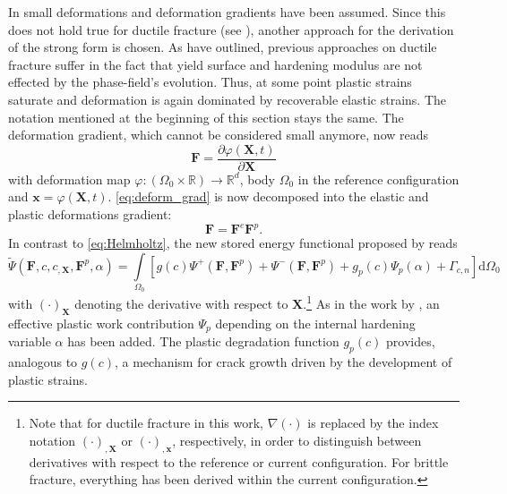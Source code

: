 In  small deformations and deformation gradients have been assumed. Since this does not hold true for ductile fracture (see ), another approach for the derivation of the strong form is chosen. As \citet{03_PF_ductile} have outlined, previous approaches on ductile fracture suffer in the fact that yield surface and hardening modulus are not effected by the phase-field's evolution. Thus, at some point plastic strains saturate and deformation is again dominated by recoverable elastic strains. The notation mentioned at the beginning of this section stays the same. The deformation gradient, which cannot be considered small anymore, now reads
\begin{equation} \label{eq:deform_grad}
	\mathbf{F}=\dfrac{\partial\varphi\left(\mathbf{X},t\right)}{\partial\mathbf{X}}
\end{equation}
with deformation map $\varphi:\left(\Omega_{0}\times\mathbb{R}\right)\rightarrow\mathbb{R}^{d}$, body $\Omega_{0}$ in the reference configuration  and $\mathbf{x}=\varphi\left(\mathbf{X},t\right)$. \eqref{eq:deform_grad} is now decomposed into the elastic and plastic deformations gradient:
\begin{equation} \label{eq:deform_grad_decomp}
	\mathbf{F}=\mathbf{F}^{e}\mathbf{F}^{p}.
\end{equation}
In contrast to \eqref{eq:Helmholtz}, the new stored energy functional proposed by \citet{03_PF_ductile} reads
\begin{equation} \label{eq:fctal_ductile}
	\tilde{\Psi}\left(\mathbf{F},c,c_{,\mathbf{X}},\mathbf{F}^{p},\alpha\right) = \int\limits_{\Omega_{0}}\left[g\left(c\right)\Psi^{+}\left(\mathbf{F},\mathbf{F}^{p}\right)+\Psi^{-}\left(\mathbf{F},\mathbf{F}^{p}\right)+g_{p}\left(c\right)\Psi_{p}\left(\alpha\right)+\Gamma_{c,n}\right]\mathrm{d}\Omega_{0}
\end{equation}
with $\left(\cdot\right)_{\mathbf{X}}$ denoting the derivative with respect to $\mathbf{X}$.\footnote{Note that for ductile fracture in this work, $\nabla\left(\cdot\right)$ is replaced by the index notation $\left(\cdot\right)_{,\mathbf{X}}$ or $\left(\cdot\right)_{,\mathbf{x}}$, respectively, in order to distinguish between derivatives with respect to the reference or current configuration. For brittle fracture, everything has been derived within the current configuration.} As in the work by \citet{06_PF_ductile}, an effective plastic work contribution $\Psi_{p}$ depending on the internal hardening variable $\alpha$ has been added. The plastic degradation function $g_{p}\left(c\right)$ provides, analogous to $g\left(c\right)$, a mechanism for crack growth driven by the development of plastic strains.

